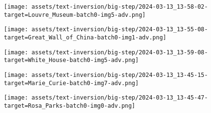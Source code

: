 \begin{figure*}[]
\vspace{0.5ex}
\begin{minipage}[t]{.025\textwidth}
     \vspace{0pt}
\end{minipage}%
\hspace{1ex}
\begin{minipage}[t]{0.98\textwidth}
    \vspace{0pt}
    \begin{subfigure}[t]{0.2\textwidth}
        \texttt{[image: assets/text-inversion/big-step/2024-03-13\_13-58-02-target=Louvre\_Museum-batch0-img5-adv.png]}
    \end{subfigure}%
    \begin{subfigure}[t]{0.2\textwidth}
        \texttt{[image: assets/text-inversion/big-step/2024-03-13\_13-55-08-target=Great\_Wall\_of\_China-batch0-img1-adv.png]}
    \end{subfigure}%
    \begin{subfigure}[t]{0.2\textwidth}
        \texttt{[image: assets/text-inversion/big-step/2024-03-13\_13-59-08-target=White\_House-batch0-img5-adv.png]}
    \end{subfigure}%
    \begin{subfigure}[t]{0.2\textwidth}
        \texttt{[image: assets/text-inversion/big-step/2024-03-13\_13-45-15-target=Marie\_Curie-batch0-img7-adv.png]}
    \end{subfigure}%
    \begin{subfigure}[t]{0.2\textwidth}
        \texttt{[image: assets/text-inversion/big-step/2024-03-13\_13-45-47-target=Rosa\_Parks-batch0-img0-adv.png]}
    \end{subfigure}%
\end{minipage}


\end{figure*}

